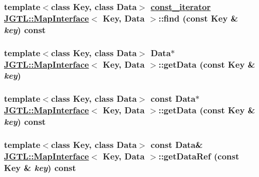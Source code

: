 \hypertarget{class_j_g_t_l_1_1_map_interface_4ec2d9323c3d2e65179c38ea7558a222}{
\subsubsection[find]{\setlength{\rightskip}{0pt plus 5cm}template$<$class Key, class Data$>$ \hyperlink{class_j_g_t_l_1_1_map_interface_bbce6cc516069a5a504e0ae5b9aecd88}{const\_\-iterator} \hyperlink{class_j_g_t_l_1_1_map_interface}{JGTL::Map\-Interface}$<$ Key, Data $>$::find (const Key \& {\em key}) const}}
\label{class_j_g_t_l_1_1_map_interface_4ec2d9323c3d2e65179c38ea7558a222}


\hypertarget{class_j_g_t_l_1_1_map_interface_b18a78bcb6d8ebac123e934aaa3fad0b}{
\subsubsection[getData]{\setlength{\rightskip}{0pt plus 5cm}template$<$class Key, class Data$>$ Data$\ast$ \hyperlink{class_j_g_t_l_1_1_map_interface}{JGTL::Map\-Interface}$<$ Key, Data $>$::get\-Data (const Key \& {\em key})}}
\label{class_j_g_t_l_1_1_map_interface_b18a78bcb6d8ebac123e934aaa3fad0b}


\hypertarget{class_j_g_t_l_1_1_map_interface_266cbd67bcff93d17649c35254d18190}{
\subsubsection[getData]{\setlength{\rightskip}{0pt plus 5cm}template$<$class Key, class Data$>$ const Data$\ast$ \hyperlink{class_j_g_t_l_1_1_map_interface}{JGTL::Map\-Interface}$<$ Key, Data $>$::get\-Data (const Key \& {\em key}) const}}
\label{class_j_g_t_l_1_1_map_interface_266cbd67bcff93d17649c35254d18190}


\hypertarget{class_j_g_t_l_1_1_map_interface_3613d63a8096f923e4e220e5aa002403}{
\subsubsection[getDataRef]{\setlength{\rightskip}{0pt plus 5cm}template$<$class Key, class Data$>$ const Data\& \hyperlink{class_j_g_t_l_1_1_map_interface}{JGTL::Map\-Interface}$<$ Key, Data $>$::get\-Data\-Ref (const Key \& {\em key}) const}}
\label{class_j_g_t_l_1_1_map_interface_3613d63a8096f923e4e220e5aa002403}


